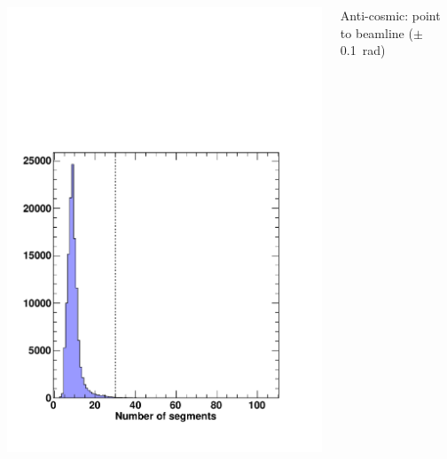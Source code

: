 \documentclass[compress]{beamer}
\begin{document}
\begin{frame}
\begin{columns}
\includegraphics[width=\linewidth]{MCBeamHalo_num_segments.pdf}

Anti-cosmic: point to beamline ($\pm$0.1~rad)


\end{columns}
\end{frame}
\end{document}
